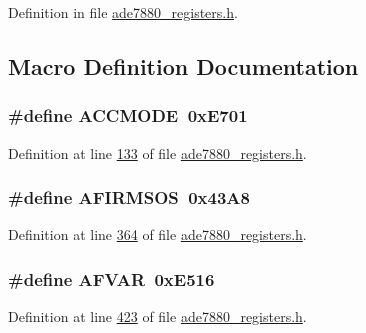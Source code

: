 Definition in file \hyperlink{a00036_source}{ade7880\-\_\-registers.\-h}.



\subsection{Macro Definition Documentation}
\hypertarget{a00036_a4d776321852a1cf7238c55e708e07459}{
\subsubsection[{A\-C\-C\-M\-O\-D\-E}]{\setlength{\rightskip}{0pt plus 5cm}\#define A\-C\-C\-M\-O\-D\-E~0x\-E701}}\label{de/d8c/a00036_a4d776321852a1cf7238c55e708e07459}


Definition at line \hyperlink{a00036_source_l00133}{133} of file \hyperlink{a00036_source}{ade7880\-\_\-registers.\-h}.

\hypertarget{a00036_a1b7700161e7c26f6642ab08eaf8ecaf3}{
\subsubsection[{A\-F\-I\-R\-M\-S\-O\-S}]{\setlength{\rightskip}{0pt plus 5cm}\#define A\-F\-I\-R\-M\-S\-O\-S~0x43\-A8}}\label{de/d8c/a00036_a1b7700161e7c26f6642ab08eaf8ecaf3}


Definition at line \hyperlink{a00036_source_l00364}{364} of file \hyperlink{a00036_source}{ade7880\-\_\-registers.\-h}.

\hypertarget{a00036_af0dabbc7f7119acf7bc4b359430b9087}{
\subsubsection[{A\-F\-V\-A\-R}]{\setlength{\rightskip}{0pt plus 5cm}\#define A\-F\-V\-A\-R~0x\-E516}}\label{de/d8c/a00036_af0dabbc7f7119acf7bc4b359430b9087}


Definition at line \hyperlink{a00036_source_l00423}{423} of file \hyperlink{a00036_source}{ade7880\-\_\-registers.\-h}.

